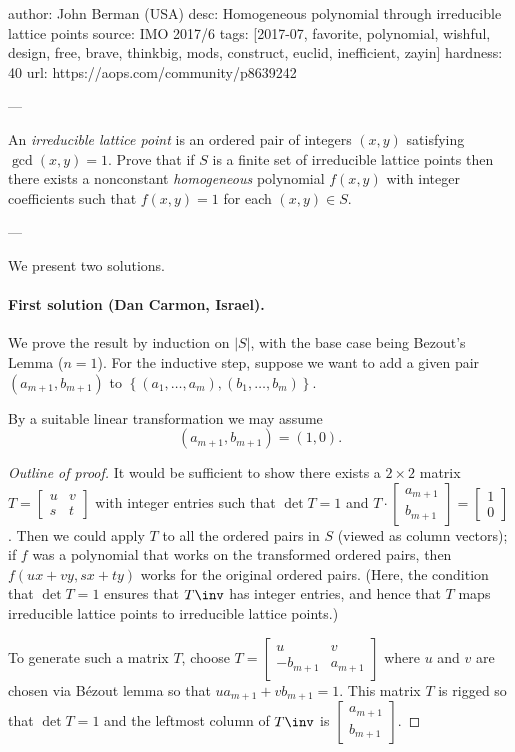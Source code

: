 author: John Berman (USA)
desc: Homogeneous polynomial through irreducible lattice points
source: IMO 2017/6
tags: [2017-07, favorite, polynomial, wishful, design, free, brave, thinkbig, mods,
  construct, euclid, inefficient, zayin]
hardness: 40
url: https://aops.com/community/p8639242

---

An \emph{irreducible lattice point} is an ordered pair
of integers $(x,y)$ satisfying $\gcd(x,y) = 1$.
Prove that if $S$ is a finite set of irreducible lattice points
then there exists a nonconstant
\emph{homogeneous} polynomial $f(x,y)$ with integer coefficients
such that $f(x,y)=1$ for each $(x,y) \in S$.

---

We present two solutions.

\paragraph{First solution (Dan Carmon, Israel).}
We prove the result by induction on $|S|$,
with the base case being Bezout's Lemma ($n=1$).
For the inductive step, suppose we want to add a given pair
$(a_{m+1},b_{m+1})$ to $\left\{ (a_1, \dots, a_m), (b_1, \dots, b_m) \right\}$.
\begin{claim*}
  [Standard]
  By a suitable linear transformation we may assume
  \[ (a_{m+1},b_{m+1}) = (1,0). \]
\end{claim*}
\begin{proof}
  [Outline of proof]
  It would be sufficient to show there exists a $2 \times 2$ matrix
  $T = \left[ \begin{smallmatrix} u & v \\ s & t \end{smallmatrix} \right]$
  with integer entries such that $\det T = 1$ and
  $T \cdot \left[ \begin{smallmatrix} a_{m+1} \\ b_{m+1} \end{smallmatrix} \right]
  = \left[ \begin{smallmatrix} 1 \\ 0 \end{smallmatrix} \right]$.
  Then we could apply $T$ to all the ordered pairs in $S$ (viewed as column vectors);
  if $f$ was a polynomial that works on the transformed ordered pairs,
  then $f(ux+vy, sx+ty)$ works for the original ordered pairs.
  (Here, the condition that $\det T = 1$ ensures that $T\inv$ has integer entries,
  and hence that $T$ maps irreducible lattice points to irreducible lattice points.)

  To generate such a matrix $T$, choose
  $T = \left[ \begin{smallmatrix} u & v  \\ -b_{m+1} & a_{m+1} \end{smallmatrix} \right]$
  where $u$ and $v$ are chosen via B\'{e}zout lemma so that $ua_{m+1} + vb_{m+1} = 1$.
  This matrix $T$ is rigged so that $\det T = 1$ and the leftmost column of $T\inv$ is
  $\left[ \begin{smallmatrix} a_{m+1} \\ b_{m+1} \end{smallmatrix} \right]$.
\end{proof}
